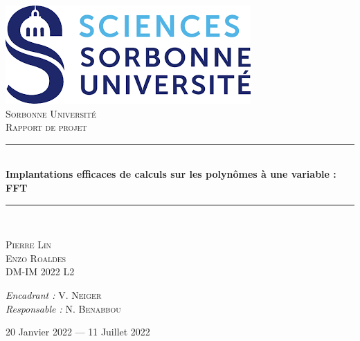 \documentclass[12pt, a4paper]{article}
\newcommand{\HRule}{\rule{\linewidth}{0.5mm}}
\begin{document}
\begin{titlepage}
  \begin{sffamily}
  \begin{center}

    \includegraphics[scale=0.4]{logo.png}~\\[1.5cm]

    \textsc{\LARGE Sorbonne Université}\\[2cm]

    \textsc{\Large Rapport de projet}\\[1.5cm]

    \HRule \\[0.4cm]
    { \huge \bfseries Implantations efficaces de calculs sur les polynômes à une variable : FFT\\[0.4cm] }

    \HRule \\[4cm]

    \begin{minipage}{0.4\textwidth}
      \begin{flushleft} \large
        \textsc{Pierre Lin}\\
        \textsc{Enzo Roaldes}\\
        DM-IM 2022 L2\\
      \end{flushleft}
    \end{minipage}
    \begin{minipage}{0.4\textwidth}
      \begin{flushright} \large
        \emph{Encadrant :} V. \textsc{Neiger}\\
        \emph{Responsable :} N. \textsc{Benabbou}\\
      \end{flushright}
    \end{minipage}

    \vfill

    {\large 20 Janvier 2022 — 11 Juillet 2022}

  \end{center}
  \end{sffamily}
\end{titlepage}
\end{document}
